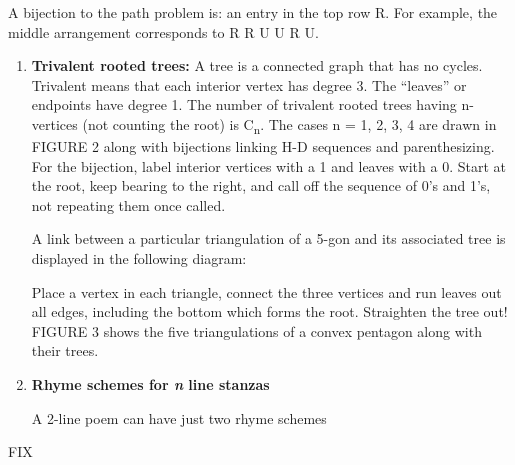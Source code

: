 \documentclass[10pt,letter]{article}
\begin{document}
A bijection to the path problem is: an entry in the top row   R. For
example, the middle arrangement corresponds to R R U U R U.
\begin{enumerate}
\def\labelenumi{\Roman{enumi}.}

\item
  \textbf{Trivalent rooted trees:} A tree is a connected graph that has
  no cycles. Trivalent means that each interior vertex has degree 3. The
  ``leaves'' or endpoints have degree 1. The number of trivalent rooted
  trees having n-vertices (not counting the root) is C\textsubscript{n}.
  The cases n = 1, 2, 3, 4 are drawn in FIGURE 2 along with bijections
  linking H-D sequences and parenthesizing. For the bijection, label
  interior vertices with a 1 and leaves with a 0. Start at the root,
  keep bearing to the right, and call off the sequence of 0's and 1's,
  not repeating them once called.

A link between a particular triangulation of a 5-gon and its
  associated tree is displayed in the following diagram:

Place a vertex in each triangle, connect the three vertices and run
  leaves out all edges, including the bottom which forms the root.
  Straighten the tree out! FIGURE 3 shows the five triangulations of a
  convex pentagon along with their trees.
\item
  \textbf{Rhyme schemes for \emph{n} line stanzas}

A 2-line poem can have just two rhyme schemes

\end{enumerate}
FIX
\end{document}
